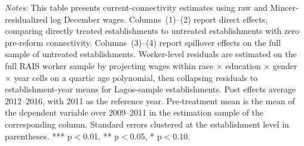 \begin{table}[H]
\begin{minipage}{\linewidth}
\textit{Notes:} This table presents current-connectivity estimates using raw and Mincer-residualized log December wages. Columns~(1)--(2) report direct effects, comparing directly treated establishments to untreated establishments with zero pre-reform connectivity. Columns~(3)--(4) report spillover effects on the full sample of untreated establishments. Worker-level residuals are estimated on the full RAIS worker sample by projecting wages within race $\times$ education $\times$ gender $\times$ year cells on a quartic age polynomial, then collapsing residuals to establishment-year means for Lagos-sample establishments. Post effects average 2012--2016, with 2011 as the reference year. Pre-treatment mean is the mean of the dependent variable over 2009--2011 in the estimation sample of the corresponding column. Standard errors clustered at the establishment level in parentheses. *** p$<$0.01, ** p$<$0.05, * p$<$0.10.
\end{minipage}
\end{table}
